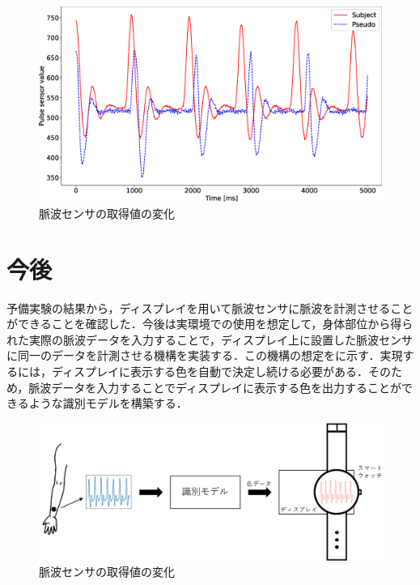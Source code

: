 \documentclass[submit,techrep]{ipsj}
\begin{document}
\begin{figure}[!t]
	\begin{center}
		\includegraphics[width=1\linewidth]{figures/pulse.eps}
	\end{center}
	\caption{脈波センサの取得値の変化}
	\label{fig:pulse}
\end{figure}


\section{今後}
\label{future_work}
予備実験の結果から，ディスプレイを用いて脈波センサに脈波を計測させることができることを確認した．今後は実環境での使用を想定して，身体部位から得られた実際の脈波データを入力することで，ディスプレイ上に設置した脈波センサに同一のデータを計測させる機構を実装する．この機構の想定をに示す．実現するには，ディスプレイに表示する色を自動で決定し続ける必要がある．そのため，脈波データを入力することでディスプレイに表示する色を出力することができるような識別モデルを構築する．

\begin{figure}[!t]
	\begin{center}
		\includegraphics[width=1\linewidth]{figures/future_work.eps}
	\end{center}
	\caption{脈波センサの取得値の変化}
	\label{fig:future_work}
\end{figure}
\end{document}
